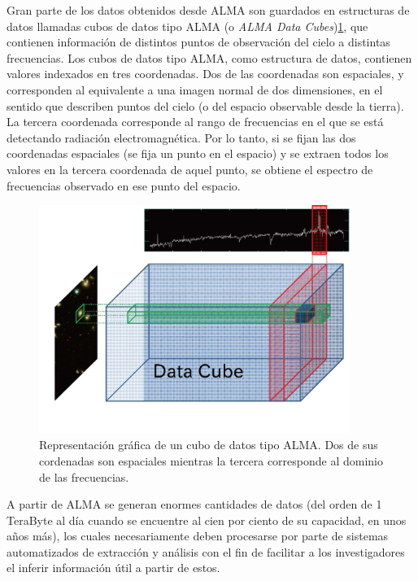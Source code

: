 Gran parte de los datos obtenidos desde ALMA son guardados en estructuras de datos llamadas cubos de datos tipo ALMA (o \textit{ALMA Data Cubes})\ref{fig:data_cube}, que contienen información de distintos puntos de observación del cielo a distintas frecuencias. Los cubos de datos tipo ALMA, como estructura de datos, contienen valores indexados en tres coordenadas. Dos de las coordenadas son espaciales, y corresponden al equivalente a una imagen normal de dos dimensiones, en el sentido que describen puntos del cielo (o del espacio observable desde la tierra). La tercera coordenada corresponde al rango de frecuencias en el que se está detectando radiación electromagnética. Por lo tanto, si se fijan las dos coordenadas espaciales (se fija un punto en el espacio) y se extraen todos los valores en la tercera coordenada de aquel punto, se obtiene el espectro de frecuencias observado en ese punto del espacio.

\begin{figure}[h!]
\begin{center}
\includegraphics[width=0.9\textwidth]{imagenes/data_cube.png}
\end{center}
\vspace*{-5mm}
\caption{Representación gráfica de un cubo de datos tipo ALMA. Dos de sus cordenadas son espaciales mientras la tercera corresponde al dominio de las frecuencias.}
\label{fig:data_cube}
\end{figure}

A partir de ALMA se generan enormes cantidades de datos (del orden de 1 TeraByte al día cuando se encuentre al cien por ciento de su capacidad, en unos años más), los cuales necesariamente deben procesarse por parte de sistemas automatizados de extracción y análisis con el fin de facilitar a los investigadores el inferir información útil a partir de estos.

